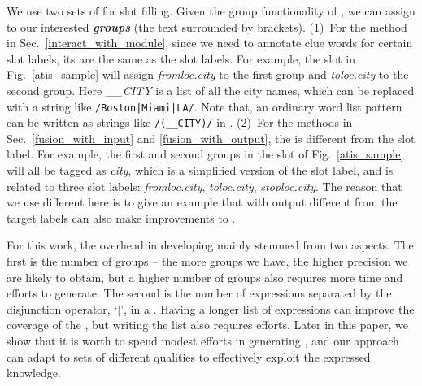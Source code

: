 We use two sets of \REs for slot filling. Given the group functionality of \RE, we can assign \REtags to our
interested \textbf{\emph{\RE groups}} (the text surrounded by brackets). (1)~For the method in Sec.~\ref{interact_with_module}, since we
need to annotate clue words for certain slot labels, its \REtags are the same as the slot labels. For example, the slot \RE in
Fig.~\ref{atis_sample} will assign \emph{fromloc.city} to the first \RE group and \emph{toloc.city} to the second group. Here
\emph{\_\_CITY} is a list of all the city names, which can be replaced with a string like \texttt{/Boston|Miami|LA/}. Note that, an
ordinary word list pattern can be written as strings like \texttt{/(\_\_CITY)/} in \RE. (2)~For the methods in Sec.~\ref{fusion_with_input}
and \ref{fusion_with_output}, the \REtag is different from the slot label. For example, the first and second \RE groups in the slot \RE of
Fig.~\ref{atis_sample} will all be tagged as \emph{city}, which is a simplified version of the slot label, and is related to three slot
labels: \emph{fromloc.city}, \emph{toloc.city}, \emph{stoploc.city}. The reason that we use different \REs here is to give an example that
\REs with output different from the target labels can also make improvements to \NN.



 For this work, the overhead in developing \REs mainly stemmed from two aspects. The first is the number of \RE
groups -- the more \RE groups we have, the higher precision we are likely to obtain, but a higher number of \RE groups also requires more
time and efforts to generate. The second is the number of expressions separated by the disjunction operator, `$|$', in a \RE. Having a
longer list of expressions can improve the coverage of the \RE, but writing the list also requires efforts. Later in this paper, we show
that it is worth to spend modest efforts in generating \REs, and our approach can adapt to \RE sets of different qualities to effectively
exploit the expressed knowledge.


